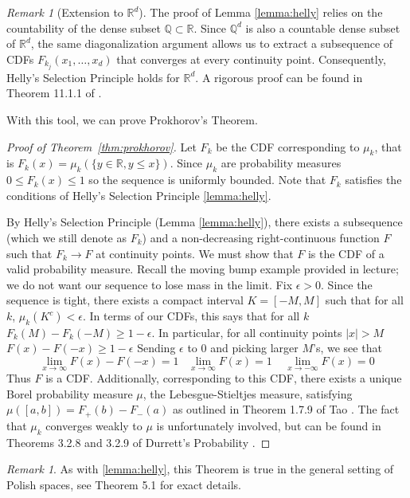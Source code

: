 \documentclass[11pt]{amsart}
\theoremstyle{definition}                  %
\theoremstyle{remark}                      %
\newtheorem{remark}[theorem]{Remark}
\begin{document}
\begin{remark}[Extension to $\mathbb{R}^d$]
    The proof of Lemma \ref{lemma:helly} relies on the countability of the dense subset $\mathbb{Q} \subset \mathbb{R}$.
    Since $\mathbb{Q}^d$ is also a countable dense subset of $\mathbb{R}^d$,
    the same diagonalization argument allows us to extract a subsequence of CDFs $F_{k_j}(x_1, \dots, x_d)$
    that converges at every continuity point. Consequently, Helly's Selection Principle holds for $\mathbb{R}^d$.
    A rigorous proof can be found in Theorem 11.1.1 of \citet{dudley2002real}.
\end{remark}

With this tool, we can prove Prokhorov's Theorem.

\begin{proof}[Proof of Theorem~\ref{thm:prokhorov}]
    Let $F_k$ be the CDF corresponding to $\mu_k$, that is $F_k(x) = \mu_k(\{y \in \mathbb{R}, y \le x\})$. Since $\mu_k$ are probability measures $0 \le F_k(x) \le 1$ so the sequence is uniformly bounded. Note that $F_k$ satisfies the conditions of Helly's Selection Principle \ref{lemma:helly}.

    By Helly's Selection Principle (Lemma \ref{lemma:helly}), there exists a subsequence (which we still denote as $F_k$) and a non-decreasing right-continuous function $F$ such that $F_k \to F$ at continuity points.
    We must show that $F$ is the CDF of a valid probability measure. Recall the moving bump example provided in lecture; we do not want our sequence to lose mass in the limit.
    Fix $\epsilon > 0$. Since the sequence is tight, there exists a compact interval $K = [-M, M]$ such that for all $k$, $\mu_k(K^c) < \epsilon$.
    In terms of our CDFs, this says that for all  $k$  $F_k(M) - F_k(- M) \ge 1 - \epsilon$.
    In particular, for all continuity points  $|x| > M$  $F(x) - F(-x) \ge 1 -\epsilon$
    Sending $\epsilon$ to $0$ and picking larger  $M$'s,
    we see that
     \[
    \lim_{x \to \infty} F(x) - F(-x) = 1 \;\;\; \lim_{x\to \infty}F(x) = 1 \;\;\;\; \lim_{x\to -\infty}F(x) = 0
    \] 
    Thus $F$ is a CDF.
    Additionally, corresponding to this CDF, there exists a unique Borel probability measure $\mu$, the Lebesgue-Stieltjes measure, satisfying $\mu([a,b]) = F_+(b) - F_-(a)$ as outlined in Theorem 1.7.9 of Tao \citep{Tao2011Measure}.
    The fact that $\mu_k$ converges weakly to $\mu$ is unfortunately involved, but can be found in Theorems 3.2.8 and 3.2.9 of Durrett's Probability \citep{Durrett2019}.
\end{proof}
\begin{remark}
    As with \ref{lemma:helly}, this Theorem is true in the general setting of Polish spaces,
    see Theorem 5.1 \citet{billingsley1999convergence} for exact details.
\end{remark}
\end{document}
